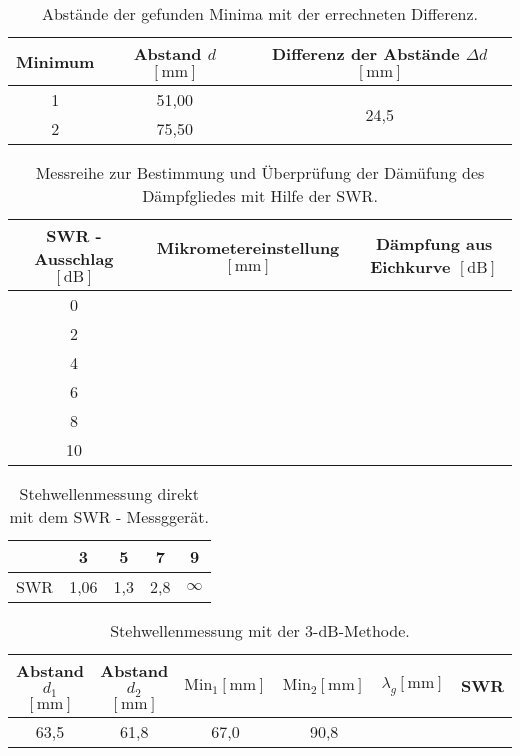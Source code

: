        \begin{table}
           \centering
           \caption{Abstände der gefunden Minima mit der errechneten Differenz.}
           \label{tab:Messreihe21}
           \begin{tabular}{c c | c}
               \toprule
               Minimum & Abstand $d$ $[\si{\milli\meter}]$ & Differenz der Abstände $ \Delta d$ $ [\si{\milli\meter}]$ \\
               \midrule
               1 & 51,00 & \multirow{2}{*}{24,5} \\
               2 & 75,50 &  \\
           \end{tabular}
       \end{table}


\begin{table}
    \centering
    \caption{Messreihe zur Bestimmung und Überprüfung der Dämüfung des Dämpfgliedes mit Hilfe der SWR.}
    \label{tab:Messreihe22}
    \begin{tabular}{c c c}
        \toprule
       SWR - Ausschlag $[\si{\dB}]$ & Mikrometereinstellung $[\si{\milli\meter}]$ & Dämpfung aus Eichkurve $[\si{\dB}]$ \\
        \midrule
        0   & ~ & ~ \\
        2   & ~ & ~ \\
        4   & ~ & ~ \\
        6   & ~ & ~ \\
        8   & ~ & ~ \\
        10  & ~ & ~ \\        
    \end{tabular}
\end{table}


\begin{table}
    \centering
    \caption{Stehwellenmessung direkt mit dem SWR - Messggerät. }
    \label{tab:Messreihe31}
    \begin{tabular}{c c c c c}
        \toprule
        ~ &  3 & 5 & 7 & 9 \\
        \midrule
       SWR & 1,06 & 1,3 & 2,8 & $\infty$ \\   
     \end{tabular}
\end{table}

\begin{table}
    \centering
    \caption{Stehwellenmessung mit der 3-dB-Methode.}
    \label{tab:Messreihe32}
    \begin{tabular}{c c c c c c }
        \toprule
        Abstand $d_1$ $[\si{\milli\meter}]$ & Abstand $d_2$ $[\si{\milli\meter}]$ & $\text{Min}_1 [\si{\milli\meter}]$&  $\text{Min}_2 [\si{\milli\meter}]$ & $\lambda_g [\si{\milli\meter}]$ & SWR \\
        \midrule
        63,5 & 61,8  & 67,0  & 90,8 & & \\   
     \end{tabular}
\end{table}

